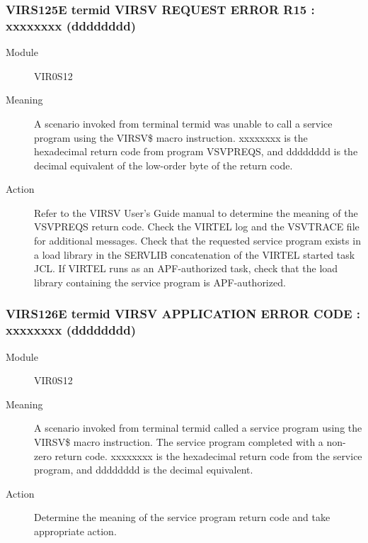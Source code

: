 \documentclass[letterpaper,10pt,english]{sphinxmanual}
\begin{document}
\subsubsection{VIRS125E termid VIRSV REQUEST ERROR \textendash{} R15 : xxxxxxxx (dddddddd)}
\label{\detokenize{messages:virs125e-termid-virsv-request-error-r15-xxxxxxxx-dddddddd}}\begin{description}
\item[{Module}] \leavevmode
VIR0S12

\item[{Meaning}] \leavevmode
A scenario invoked from terminal termid was unable to call a service program using the VIRSV\$ macro instruction. xxxxxxxx is the hexadecimal return code from program VSVPREQS, and dddddddd is the decimal equivalent of the low-order byte of the return code.

\item[{Action}] \leavevmode
Refer to the VIRSV User’s Guide manual to determine the meaning of the VSVPREQS return code. Check the VIRTEL log and the VSVTRACE file for additional messages. Check that the requested service program exists in a load library in the SERVLIB concatenation of the VIRTEL started task JCL. If VIRTEL runs as an APF-authorized task, check that the load library containing the service program is APF-authorized.

\end{description}


\subsubsection{VIRS126E termid VIRSV APPLICATION ERROR CODE : xxxxxxxx (dddddddd)}
\label{\detokenize{messages:virs126e-termid-virsv-application-error-code-xxxxxxxx-dddddddd}}\begin{description}
\item[{Module}] \leavevmode
VIR0S12

\item[{Meaning}] \leavevmode
A scenario invoked from terminal termid called a service program using the VIRSV\$ macro instruction. The service program completed with a non-zero return code. xxxxxxxx is the hexadecimal return code from the service program, and dddddddd is the decimal equivalent.

\item[{Action}] \leavevmode
Determine the meaning of the service program return code and take appropriate action.

\end{description}
\end{document}
